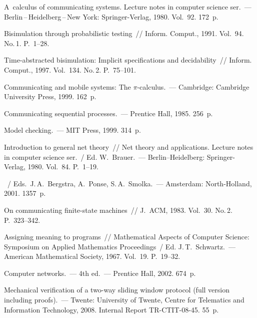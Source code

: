 \begin{multicols}{2}

{\small\frenchspacing
{%
\begin{thebibliography}{99}



 A~calculus of communicating systems.
Lecture notes in computer science ser.~--- Berlin\,--\,Heidelberg\,--\,New York:
Springer-Verlag, 1980. Vol.~92. 172~p.

 Bisimulation through probabilistic
testing~// Inform. Comput., 1991. Vol.~94.
No.\,1. P.~1--28.

 Time-abstracted bisimulation: Implicit
specifications and decidability~// Inform.
Comput., 1997. Vol.~134. No.\,2. P.~75--101.

 Communicating and mobile systems: The\linebreak
$\pi$-calculus.~--- Cambridge: Cambridge University Press, 1999. 162~p.

 Communicating sequential processes.~---
Prentice Hall, 1985. 256~p.

 Model checking.~---
MIT Press, 1999. 314~p.

 Introduction to general net theory~//
Net theory and applications. Lecture notes in computer science ser.~/
Ed. W.~Brauer.~--- Berlin--Heidelberg: Springer-Verlag, 1980. Vol.~84. P.~1--19.

~/ Eds.\ J.\,A.~Bergstra,
A.~Ponse, S.\,A.~Smolka.~---  Amsterdam: North-Holland, 2001. 1357~p.

 On communicating finite-state machines~//
J.~ACM, 1983. Vol.~30. No.\,2. P.~323--342.

 Assigning meaning to programs~// Mathematical
Aspects of Computer Science:  Symposium on Applied
Mathematics Proceedings~/ Ed. J.\,T.~Schwartz.~--- American Mathematical Society,
1967. Vol.~19. P.~19--32.

 Computer networks.~--- 4th ed.~---
Prentice Hall, 2002. 674~p.

 Mechanical verification of a two-way sliding window protocol
 (full version including proofs).~--- Twente: University of Twente,
Centre for Telematics and Information Technology, 2008.
Internal Report TR-CTIT-08-45. 55~p.



\end{thebibliography}}}
\end{multicols}
